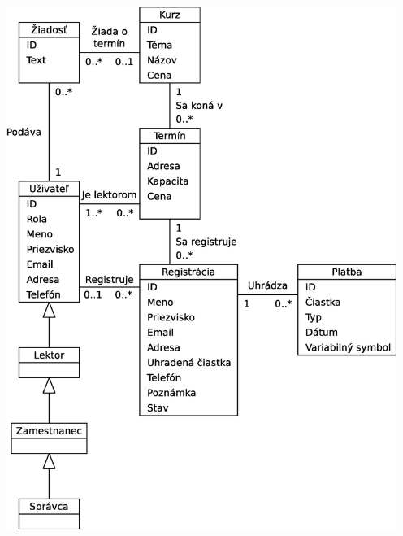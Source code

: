 \documentclass[12pt,a4paper,titlepage,final]{report}
\begin{document}
		\begin{center}
			\captionsetup{type=figure}
			\includegraphics[height=17cm]{img/konceptualny_diagram_tried.eps}
		\end{center}
\end{document}

